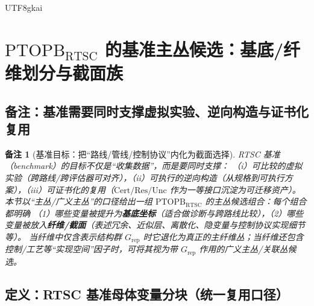 \documentclass[12pt]{article}
\newtheorem{remark}{备注}[section]
\newcommand{\PTOPB}{\ensuremath{\mathrm{PTOPB}}}
\newcommand{\RTSC}{\textsf{RTSC}}
\begin{document}
\begin{CJK*}{UTF8}{gkai}
\clearpage
\section{\PTOPB$_{\mathrm{RTSC}}$ 的基准主丛候选：基底/纤维划分与截面族}
\label{sec:rtsc-benchmark-ptopb-candidates}

\subsection{备注：基准需要同时支撑虚拟实验、逆向构造与证书化复用}

\begin{remark}[基准目标：把“路线/管线/控制协议”内化为截面选择]
\RTSC{} 基准（benchmark）的目标不仅是“收集数据”，而是要同时支撑：
（i）可比较的虚拟实验（跨路线/跨评估器可对齐），（ii）可执行的逆向构造（从规格到可执行方案），（iii）可证书化的复用（$\mathrm{Cert}/\mathrm{Res}/\mathrm{Unc}$ 作为一等接口沉淀为可迁移资产）。
本节以“主丛/广义主丛”的口径给出一组 \PTOPB$_{\mathrm{RTSC}}$ 的主丛候选组合：每个组合都明确
（1）哪些变量被提升为\textbf{基底坐标}（适合做诊断与跨路线比较），（2）哪些变量被放入\textbf{纤维/截面}（表述冗余、近似层、离散化、隐变量与控制协议实现细节等）。
当纤维中仅含表示结构群 $G_{\mathrm{rep}}$ 时它退化为真正的主纤维丛；当纤维还包含控制/工艺等“实现空间”因子时，可将其视为带 $G_{\mathrm{rep}}$ 作用的广义主丛/关联丛候选。
\end{remark}

\subsection{定义：RTSC 基准母体变量分块（统一复用口径）}


\end{CJK*}
\end{document}
